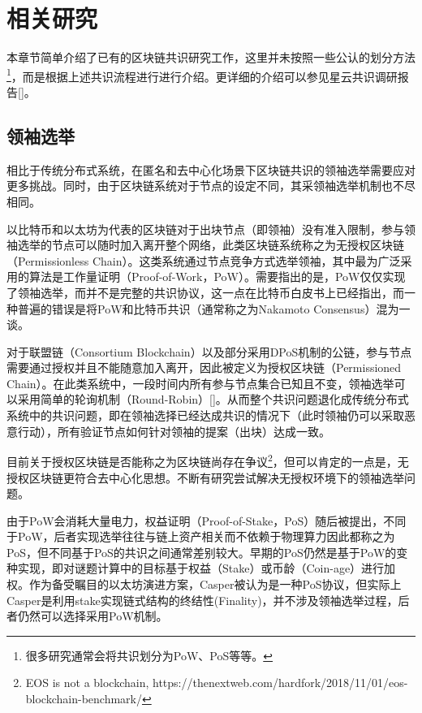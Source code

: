 \section{相关研究}
本章节简单介绍了已有的区块链共识研究工作，这里并未按照一些公认的划分方法\footnote{很多研究通常会将共识划分为PoW、PoS等等。}，而是根据上述共识流程进行进行介绍。更详细的介绍可以参见星云共识调研报告[]。

\subsection{领袖选举}
相比于传统分布式系统，在匿名和去中心化场景下区块链共识的领袖选举需要应对更多挑战。同时，由于区块链系统对于节点的设定不同，其采领袖选举机制也不尽相同。

以比特币\cite{nakamoto2008bitcoin}和以太坊\cite{wood2014ethereum}为代表的区块链对于出块节点（即领袖）没有准入限制，参与领袖选举的节点可以随时加入离开整个网络，此类区块链系统称之为无授权区块链（Permissionless Chain）。这类系统通过节点竞争方式选举领袖，其中最为广泛采用的算法是工作量证明（Proof-of-Work，PoW）。需要指出的是，PoW仅仅实现了领袖选举，而并不是完整的共识协议，这一点在比特币白皮书上已经指出\cite{nakamoto2008bitcoin}，而一种普遍的错误是将PoW和比特币共识（通常称之为Nakamoto Consensus）混为一谈。

对于联盟链（Consortium Blockchain）以及部分采用DPoS机制的公链\cite{grigg2017eos}，参与节点需要通过授权并且不能随意加入离开，因此被定义为授权区块链（Permissioned Chain）。在此类系统中，一段时间内所有参与节点集合已知且不变，领袖选举可以采用简单的轮询机制（Round-Robin）[]。从而整个共识问题退化成传统分布式系统中的共识问题，即在领袖选择已经达成共识的情况下（此时领袖仍可以采取恶意行动），所有验证节点如何针对领袖的提案（出块）达成一致。

目前关于授权区块链是否能称之为区块链尚存在争议\footnote{EOS is not a blockchain, https://thenextweb.com/hardfork/2018/11/01/eos-blockchain-benchmark/}，但可以肯定的一点是，无授权区块链更符合去中心化思想。不断有研究尝试解决无授权环境下的领袖选举问题。

由于PoW会消耗大量电力，权益证明（Proof-of-Stake，PoS）随后被提出，不同于PoW，后者实现选举往往与链上资产相关而不依赖于物理算力因此都称之为PoS，但不同基于PoS的共识之间通常差别较大。早期的PoS仍然是基于PoW的变种实现\cite{king2012ppcoin}，即对谜题计算中的目标基于权益（Stake）或币龄（Coin-age）进行加权。作为备受瞩目的以太坊演进方案，Casper\cite{buterin2017casper}被认为是一种PoS协议，但实际上Casper是利用stake实现链式结构的终结性(Finality)，并不涉及领袖选举过程，后者仍然可以选择采用PoW机制。

